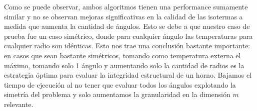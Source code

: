 Como se puede observar, ambos algoritmos tienen una performance sumamente similar y no se observan mejoras significativas en la calidad de las isotermas a medida que aumenta la cantidad de ángulos. Esto se debe a que nuestro caso de prueba fue un caso simétrico, donde para cualquier ángulo las temperaturas para cualquier radio son idénticas. Esto nos trae una conclusión bastante importante: en casos que sean bastante simétricos, tomando como temperatura externa el máximo, tomando solo 1 ángulo y aumentando solo la cantidad de radios es la estrategia óptima para evaluar la integridad estructural de un horno. Bajamos el tiempo de ejecución al no tener que evaluar todos los ángulos explotando la simetría del problema y solo aumentamos la granularidad en la dimensión $m$ relevante.

